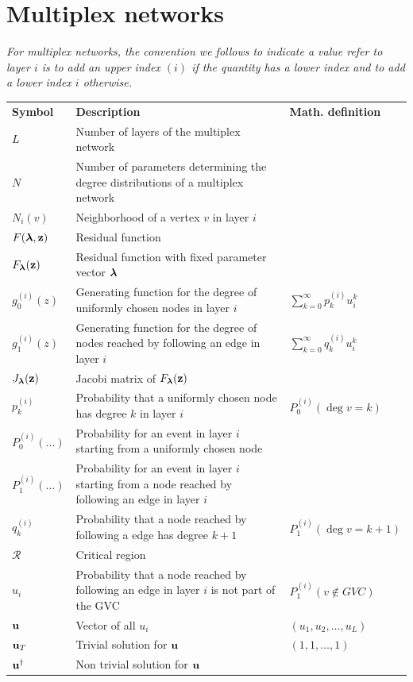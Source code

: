 \documentclass[
11pt, %
english, %
singlespacing, %
nolistspacing, %
liststotoc, %
headsepline, %
]{MastersDoctoralThesis} %
\begin{document}
\newpage

\section*{Multiplex networks}

\emph{For multiplex networks, the convention we follows to indicate a value refer to layer $i$ is to add an upper index $(i)$ if the quantity has a lower index and to add a lower index $i$ otherwise.}

\begin{longtable}{m{}m{}m{}}

\textbf{Symbol}	& \textbf{Description} & \textbf{Math. definition} \\
\addlinespace

$L$ 				& Number of layers of the multiplex network \\
$N$					& Number of parameters determining the degree distributions of a multiplex network \\
$N_i(v)$ 			& Neighborhood of a vertex $v$ in layer $i$ \\
$F(\boldsymbol{\mathrm{\lambda}}, \boldsymbol{\mathrm{z}})$ & Residual function \\
$F_{\boldsymbol{\mathrm{\lambda}}}(\boldsymbol{\mathrm{z}})$		& Residual function with fixed parameter vector $\boldsymbol{\mathrm{\lambda}}$ \\
$g^{(i)}_0(z)$		& Generating function for the degree of uniformly chosen nodes in layer $i$ & $\sum_{k=0}^\infty p^{(i)}_k u_i^k$ \\
$g^{(i)}_1(z)$		& Generating function for the degree of nodes reached by following an edge in layer $i$ & $\sum_{k=0}^\infty q^{(i)}_k u_i^k$ \\
$J_{\boldsymbol{\mathrm{\lambda}}}(\boldsymbol{\mathrm{z}})$					& Jacobi matrix of $F_{\boldsymbol{\mathrm{\lambda}}}(\boldsymbol{\mathrm{z}})$ \\
$p^{(i)}_k$			& Probability that a uniformly chosen node has degree $k$ in layer $i$ & $P^{(i)}_0(\deg{v} = k)$ \\
$P^{(i)}_0(\dots)$	& Probability for an event in layer $i$ starting from a uniformly chosen node  \\
$P^{(i)}_1(\dots)$	& Probability for an event in layer $i$ starting from a node reached by following an edge in layer $i$ \\
$q^{(i)}_k$		& Probability that a node reached by following a edge has degree $k + 1$ & $P^{(i)}_1(\deg{v} = k + 1)$ \\
$\mathcal{R}$	& Critical region \\
$u_i$			& Probability that a node reached by following an edge in layer $i$ is not part of the GVC & $P^{(i)}_1(v \notin GVC)$ \\
$\boldsymbol{\mathrm{u}}$			& Vector of all $u_i$ & $(u_1, u_2, \dots, u_L)$ \\
$\boldsymbol{\mathrm{u}}_T$		& Trivial solution for $\boldsymbol{\mathrm{u}}$ & $(1, 1, \dots, 1)$ \\
$\boldsymbol{\mathrm{u}}^\dagger$	& Non trivial solution for $\boldsymbol{\mathrm{u}}$ \\


\end{longtable}
\end{document}
